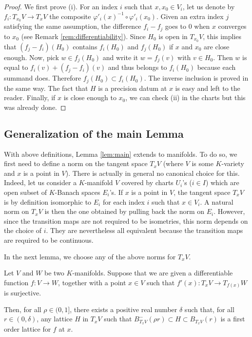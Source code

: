 \documentclass{lms}
\begin{document}
\begin{proof}
We first prove (i). For an index $i$ such that $x, x_0 \in V_i$, let us 
denote by $f_i : T_{x_0} V \to T_x V$ the composite $\varphi'_i(x)^{-1} 
\circ \varphi'_i(x_0)$. Given an extra index $j$ satisfying the same
assumption, the difference $f_i - f_j$ goes to $0$ when $x$ converges to 
$x_0$ (see Remark \ref{rem:differentiability}). Since $H_0$ is open in 
$T_{x_0} V$, this implies that $(f_j - f_i)(H_0)$ contains $f_i(H_0)$ 
and $f_j(H_0)$ if $x$ and $x_0$ are close enough. Now, pick $w \in 
f_j(H_0)$ and write it $w = f_j(v)$ with $v \in H_0$. Then $w$ is equal 
to $f_i(v) + (f_j - f_i)(v)$ and thus belongs to $f_i(H_0)$ because each 
summand does. Therefore $f_j(H_0) \subset f_i(H_0)$. The inverse 
inclusion is proved in the same way. The fact that $H$ is a 
precision datum at $x$ is easy and left to the reader.
Finally, if $x$ is close enough to $x_0$, we can check (ii) in the 
charts but this was already done.
\end{proof}

\subsection{Generalization of the main Lemma}

With above definitions, Lemma \ref{lem:main} extends to 
manifolds. To do so, we first need to define 
a norm on the tangent space $T_x V$ (where $V$ is some $K$-variety and 
$x$ is a point in $V$). There is actually in general no canonical choice 
for this. Indeed, let us consider a $K$-manifold $V$ covered by charts 
$U_i$'s ($i \in I$) which are open subset of $K$-Banach spaces $E_i$'s. If $x$ 
is a point in $V$, the tangent space $T_x V$ is by definition isomorphic 
to $E_i$ for each index $i$ such that $x \in V_i$. A natural norm on 
$T_x V$ is then the one obtained by pulling back the norm on $E_i$. 
However, since the transition maps are not required to be isometries, 
this norm depends on the choice of $i$. They are nevertheless all
equivalent because the transition maps are required to be continuous.

In the next lemma, we choose any of the above norms for $T_x V$.

\begin{lem}
Let $V$ and $W$ be two $K$-manifolds. 
Suppose that we are given a differentiable function $f : V \to W$, 
together with a point $x \in V$ such that $f'(x) : T_x V \to T_{f(x)} W$ 
is surjective. 

Then, for all $\rho \in (0, 1]$, there exists a positive real 
number $\delta$ such that, for all $r \in (0, \delta)$, any lattice
$H$ in $T_x V$ such that $B^-_{T_x V}(\rho r) \subset H \subset B_{T_x V}(r)$ is a first
order lattice for $f$ at $x$.
\end{lem}
\end{document}
